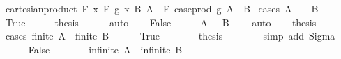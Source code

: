 \begin{isabellebody}
%
\isadelimproof
\isanewline
%
\endisadelimproof
\isanewline
{}\isamarkupfalse%
\ cartesian{\isacharunderscore}{\kern0pt}product{\isacharcolon}{\kern0pt}\ {\isachardoublequoteopen}F\ {\isacharparenleft}{\kern0pt}{\isasymlambda}x{\isachardot}{\kern0pt}\ F\ {\isacharparenleft}{\kern0pt}g\ x{\isacharparenright}{\kern0pt}\ B{\isacharparenright}{\kern0pt}\ A\ {\isacharequal}{\kern0pt}\ F\ {\isacharparenleft}{\kern0pt}case{\isacharunderscore}{\kern0pt}prod\ g{\isacharparenright}{\kern0pt}\ {\isacharparenleft}{\kern0pt}A\ {\isasymtimes}\ B{\isacharparenright}{\kern0pt}{\isachardoublequoteclose}\isanewline
%
\isadelimproof
%
\endisadelimproof
%
\isatagproof
{}\isamarkupfalse%
\ {\isacharparenleft}{\kern0pt}cases\ {\isachardoublequoteopen}A\ {\isacharequal}{\kern0pt}\ {\isacharbraceleft}{\kern0pt}{\isacharbraceright}{\kern0pt}\ {\isasymor}\ B\ {\isacharequal}{\kern0pt}\ {\isacharbraceleft}{\kern0pt}{\isacharbraceright}{\kern0pt}{\isachardoublequoteclose}{\isacharparenright}{\kern0pt}\isanewline
\ \ \isamarkupfalse%
\ True\isanewline
\ \ \isamarkupfalse%
\ \isamarkupfalse%
\ {\isacharquery}{\kern0pt}thesis\isanewline
\ \ \ \ \isamarkupfalse%
\ auto\isanewline
{}\isamarkupfalse%
\isanewline
\ \ \isamarkupfalse%
\ False\isanewline
\ \ \isamarkupfalse%
\ \isamarkupfalse%
\ {\isachardoublequoteopen}A\ {\isasymnoteq}\ {\isacharbraceleft}{\kern0pt}{\isacharbraceright}{\kern0pt}{\isachardoublequoteclose}\ {\isachardoublequoteopen}B\ {\isasymnoteq}\ {\isacharbraceleft}{\kern0pt}{\isacharbraceright}{\kern0pt}{\isachardoublequoteclose}\ \isamarkupfalse%
\ auto\isanewline
\ \ \isamarkupfalse%
\ {\isacharquery}{\kern0pt}thesis\isanewline
\ \ \isamarkupfalse%
\ {\isacharparenleft}{\kern0pt}cases\ {\isachardoublequoteopen}finite\ A\ {\isasymand}\ finite\ B{\isachardoublequoteclose}{\isacharparenright}{\kern0pt}\isanewline
\ \ \ \ \isamarkupfalse%
\ True\isanewline
\ \ \ \ \isamarkupfalse%
\ \isamarkupfalse%
\ {\isacharquery}{\kern0pt}thesis\isanewline
\ \ \ \ \ \ \isamarkupfalse%
\ {\isacharparenleft}{\kern0pt}simp\ add{\isacharcolon}{\kern0pt}\ Sigma{\isacharparenright}{\kern0pt}\isanewline
\ \ \isamarkupfalse%
\isanewline
\ \ \ \ \isamarkupfalse%
\ False\isanewline
\ \ \ \ \isamarkupfalse%
\ \isamarkupfalse%
\ {\isachardoublequoteopen}infinite\ A{\isachardoublequoteclose}\ {\isacharbar}{\kern0pt}\ {\isachardoublequoteopen}infinite\ B{\isachardoublequoteclose}\ \isamarkupfalse%

\end{isabellebody}
